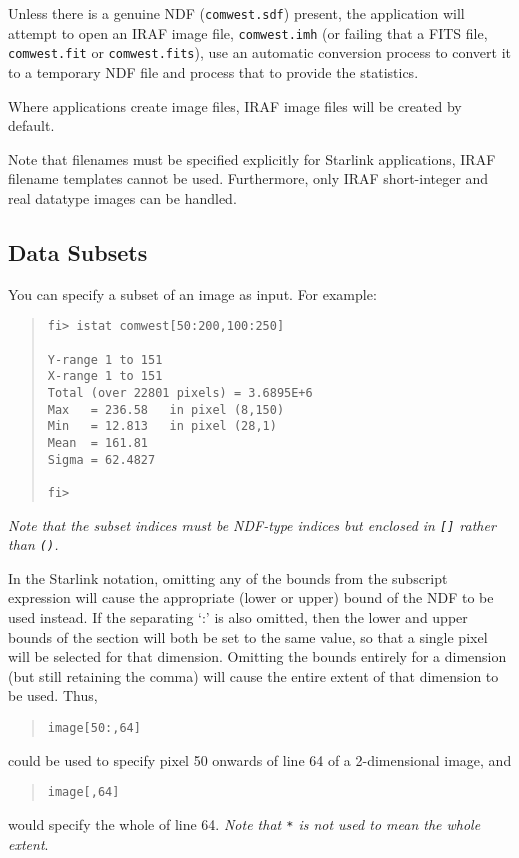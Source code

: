 \documentclass[twoside,11pt]{article}
\newcommand{\htmlref}[2]{#1}
\newcommand{\xref}[3]{#1}
\newcommand{\xlabel}[1]{}
\begin{document}
Unless there is a genuine NDF ({\texttt{comwest.sdf}}) present, the application
will attempt to open an IRAF image file, \texttt{comwest.imh} (or failing that
a FITS file, \texttt{comwest.fit} or \texttt{comwest.fits}), use an
\htmlref{automatic conversion process}{more_on_automatic_data_conversion}
to convert it to a temporary NDF file and process that to provide the
statistics.

Where applications create image files, IRAF image files will be created by
default.

Note that filenames must be specified explicitly for Starlink applications,
IRAF filename templates cannot be used.
Furthermore, only IRAF short-integer and real datatype images can be handled.

\subsection{\xlabel{data_subsets}Data Subsets}
You can specify a subset of an image as input. For example:
\begin{quote} \begin{verbatim}
fi> istat comwest[50:200,100:250]

Y-range 1 to 151
X-range 1 to 151
Total (over 22801 pixels) = 3.6895E+6
Max   = 236.58   in pixel (8,150)
Min   = 12.813   in pixel (28,1)
Mean  = 161.81
Sigma = 62.4827

fi>
\end{verbatim} \end{quote}
\emph{Note that the subset indices must be
\xref{NDF-type indices}{sun33}{using_subscripts_to_access_ndf_sections}
 but enclosed in \texttt{[]} rather than
\texttt{()}.}

In the Starlink notation, omitting any of the bounds from the subscript
expression will cause the appropriate (lower or upper) bound of the NDF to be
used instead.
If the separating `:' is also omitted, then the lower and upper bounds of the
section will both be set to the same value, so that a single pixel will be
selected for that dimension. Omitting the bounds entirely for a dimension (but
still retaining the comma) will cause the entire extent of that dimension to
be used.
Thus,
\begin{quote} \begin{verbatim}
image[50:,64]
\end{verbatim} \end{quote}
could be used to specify pixel 50 onwards of line 64 of a 2-dimensional image,
and
\begin{quote} \begin{verbatim}
image[,64]
\end{verbatim} \end{quote}
would specify the whole of line 64.
\emph{Note that \texttt{*} is not used to mean the whole extent}.
\end{document}
